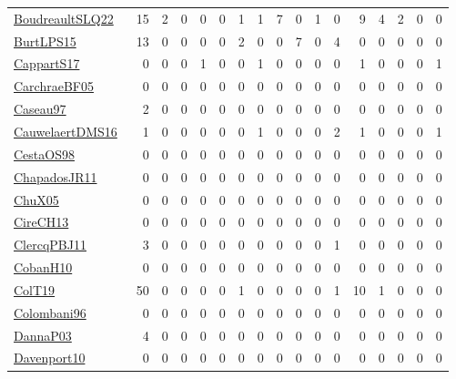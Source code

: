 {\begin{longtable}{l*{16}{r}}
\href{papers/BoudreaultSLQ22.pdf}{BoudreaultSLQ22}~\cite{BoudreaultSLQ22} & 15 & 2 & 0 & 0 & 0 & 1 & 1 & 7 & 0 & 1 & 0 & 9 & 4 & 2 & 0 & 0\\
\href{papers/BurtLPS15.pdf}{BurtLPS15}~\cite{BurtLPS15} & 13 & 0 & 0 & 0 & 0 & 2 & 0 & 0 & 7 & 0 & 4 & 0 & 0 & 0 & 0 & 0\\
\href{papers/CappartS17.pdf}{CappartS17}~\cite{CappartS17} & 0 & 0 & 0 & 1 & 0 & 0 & 1 & 0 & 0 & 0 & 0 & 1 & 0 & 0 & 0 & 1\\
\href{papers/CarchraeBF05.pdf}{CarchraeBF05}~\cite{CarchraeBF05} & 0 & 0 & 0 & 0 & 0 & 0 & 0 & 0 & 0 & 0 & 0 & 0 & 0 & 0 & 0 & 0\\
\href{papers/Caseau97.pdf}{Caseau97}~\cite{Caseau97} & 2 & 0 & 0 & 0 & 0 & 0 & 0 & 0 & 0 & 0 & 0 & 0 & 0 & 0 & 0 & 0\\
\href{papers/CauwelaertDMS16.pdf}{CauwelaertDMS16}~\cite{CauwelaertDMS16} & 1 & 0 & 0 & 0 & 0 & 0 & 1 & 0 & 0 & 0 & 2 & 1 & 0 & 0 & 0 & 1\\
\href{papers/CestaOS98.pdf}{CestaOS98}~\cite{CestaOS98} & 0 & 0 & 0 & 0 & 0 & 0 & 0 & 0 & 0 & 0 & 0 & 0 & 0 & 0 & 0 & 0\\
\href{papers/ChapadosJR11.pdf}{ChapadosJR11}~\cite{ChapadosJR11} & 0 & 0 & 0 & 0 & 0 & 0 & 0 & 0 & 0 & 0 & 0 & 0 & 0 & 0 & 0 & 0\\
\href{papers/ChuX05.pdf}{ChuX05}~\cite{ChuX05} & 0 & 0 & 0 & 0 & 0 & 0 & 0 & 0 & 0 & 0 & 0 & 0 & 0 & 0 & 0 & 0\\
\href{papers/CireCH13.pdf}{CireCH13}~\cite{CireCH13} & 0 & 0 & 0 & 0 & 0 & 0 & 0 & 0 & 0 & 0 & 0 & 0 & 0 & 0 & 0 & 0\\
\href{papers/ClercqPBJ11.pdf}{ClercqPBJ11}~\cite{ClercqPBJ11} & 3 & 0 & 0 & 0 & 0 & 0 & 0 & 0 & 0 & 0 & 1 & 0 & 0 & 0 & 0 & 0\\
\href{papers/CobanH10.pdf}{CobanH10}~\cite{CobanH10} & 0 & 0 & 0 & 0 & 0 & 0 & 0 & 0 & 0 & 0 & 0 & 0 & 0 & 0 & 0 & 0\\
\href{papers/ColT19.pdf}{ColT19}~\cite{ColT19} & 50 & 0 & 0 & 0 & 0 & 1 & 0 & 0 & 0 & 0 & 1 & 10 & 1 & 0 & 0 & 0\\
\href{papers/Colombani96.pdf}{Colombani96}~\cite{Colombani96} & 0 & 0 & 0 & 0 & 0 & 0 & 0 & 0 & 0 & 0 & 0 & 0 & 0 & 0 & 0 & 0\\
\href{papers/DannaP03.pdf}{DannaP03}~\cite{DannaP03} & 4 & 0 & 0 & 0 & 0 & 0 & 0 & 0 & 0 & 0 & 0 & 0 & 0 & 0 & 0 & 0\\
\href{papers/Davenport10.pdf}{Davenport10}~\cite{Davenport10} & 0 & 0 & 0 & 0 & 0 & 0 & 0 & 0 & 0 & 0 & 0 & 0 & 0 & 0 & 0 & 0\\

\end{longtable}}
